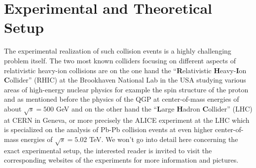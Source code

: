 \section{Experimental and Theoretical Setup}
The experimental realization of such collision events is a highly challenging problem itself. The two most known colliders focusing on different aspects of relativistic heavy-ion collisions are on the one hand the \enquote{\textbf{R}elativistic \textbf{H}eavy-\textbf{I}on \textbf{C}ollider} (RHIC) at the Brookhaven National Lab in the USA studying various areas of high-energy nuclear physics for example the spin structure of the proton and as mentioned before the physics of the QGP at center-of-mass energies of about $\sqrt{s}=500$ GeV and on the other hand the \enquote{\textbf{L}arge \textbf{H}adron \textbf{C}ollider} (LHC) at CERN in Geneva, or more precisely the ALICE experiment at the LHC which is specialized on the analysis of Pb-Pb collision events at even higher center-of-mass energies of $\sqrt{s}=5.02$ TeV. We won't go into detail here concerning the exact experimental setup, the interested reader is invited to visit the corresponding websites of the experiments for more information and pictures. \\

